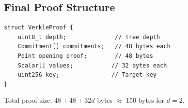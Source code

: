 \subsection{Final Proof Structure}

\begin{lstlisting}[caption=Verkle Proof Format]
struct VerkleProof {
    uint8_t depth;              // Tree depth
    Commitment[] commitments;   // 48 bytes each
    Point opening_proof;        // 48 bytes
    Scalar[] values;           // 32 bytes each
    uint256 key;               // Target key
}
\end{lstlisting}

Total proof size: $48 + 48 + 32d$ bytes $\approx$ 150 bytes for $d = 2$.

